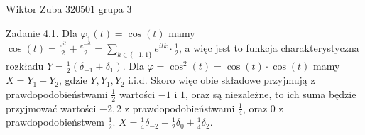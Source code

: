 \documentclass{article}
\begin{document}
Wiktor Zuba 320501 grupa 3
\newline

Zadanie 4.1.
\newline
\newline
Dla $\varphi_1(t)=\cos(t)$ mamy $\cos(t)=\frac{e^{it}}{2}+\frac{e^{-it}}{2}=\sum\limits_{k\in\{-1,1\}}e^{itk}\cdot\frac{1}{2}$,
a więc jest to funkcja charakterystyczna rozkładu $Y=\frac{1}{2}(\delta_{-1}+\delta_{1})$.\newline
Dla $\varphi=\cos^2(t)=\cos(t)\cdot\cos(t)$ mamy $X=Y_1+Y_2$, gdzie $Y,Y_1,Y_2$ i.i.d.\newline
Skoro więc obie składowe przyjmują z prawdopodobieństwami $\frac{1}{2}$ wartości $-1$ i $1$, oraz są niezależne,
to ich suma będzie przyjmować wartości $-2,2$ z prawdopodobieństwami $\frac{1}{4}$, oraz $0$ z prawdopodobieństwem $\frac{1}{2}$.\newline
$X=\frac{1}{4}\delta_{-2}+\frac{1}{2}\delta_{0}+\frac{1}{4}\delta_{2}$.
\newline
\end{document}
